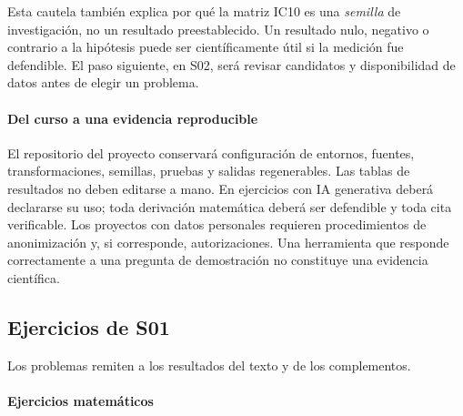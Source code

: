 Esta cautela también explica por qué la matriz IC10 es una \emph{semilla}
de investigación, no un resultado preestablecido. Un resultado nulo,
negativo o contrario a la hipótesis puede ser científicamente útil si
la medición fue defendible. El paso siguiente, en S02, será revisar
candidatos y disponibilidad de datos antes de elegir un problema.

\paragraph{Del curso a una evidencia reproducible}

El repositorio del proyecto conservará configuración de entornos, fuentes,
transformaciones, semillas, pruebas y salidas regenerables. Las tablas de resultados
no deben editarse a mano. En ejercicios con IA generativa deberá declararse su
uso; toda derivación matemática deberá ser defendible y toda cita verificable.
Los proyectos con datos personales requieren procedimientos de anonimización y,
si corresponde, autorizaciones. Una herramienta que responde correctamente a una
pregunta de demostración no constituye una evidencia científica.

\subsection{Ejercicios de S01}\label{s01:cap:ejercicios}
Los problemas remiten a los resultados del texto y de los complementos.
\paragraph{Ejercicios matemáticos}

